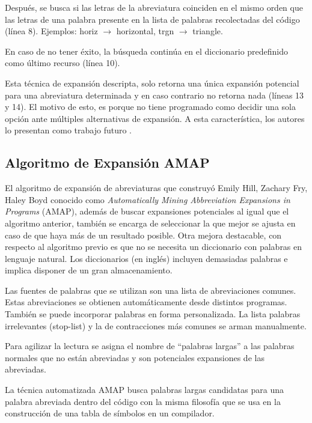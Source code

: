\documentclass[a4paper,12pt]{report}
\begin{document}
Después, se busca si las letras de la abreviatura coinciden en el mismo orden que las letras de una palabra presente en la lista de palabras recolectadas del código (línea 8). Ejemplos: \textsf{horiz} $\rightarrow$ \textsf{horizontal}, \textsf{trgn} $\rightarrow$ \textsf{triangle}.

En caso de no tener éxito, la búsqueda continúa en el diccionario predefinido como último recurso (línea 10).


Esta técnica de expansión descripta, solo retorna una única expansión potencial para una abreviatura determinada y en caso contrario no retorna nada (líneas 13 y 14). El motivo de esto, es porque no tiene programado como decidir una sola opción ante múltiples alternativas de expansión. A esta característica, los autores lo presentan como trabajo futuro \cite{LFBEX07,EZH08}.

\subsection{Algoritmo de Expansión AMAP}

El algoritmo de expansión de abreviaturas que construyó Emily Hill, Zachary Fry, Haley Boyd \cite{EZH08} conocido como \textit{Automatically Mining Abbreviation Expansions in Programs} (AMAP), además de buscar expansiones potenciales al igual que el algoritmo anterior, también se encarga de seleccionar la que mejor se ajusta en caso de que haya más de un resultado posible. Otra mejora destacable, con respecto al algoritmo previo es que no se necesita un diccionario con palabras en lenguaje natural. Los diccionarios (en inglés) incluyen demasiadas palabras e implica disponer de un gran almacenamiento. 

Las fuentes de palabras que se utilizan son una lista de abreviaciones comunes. Estas abreviaciones se obtienen automáticamente desde distintos programas. También se puede incorporar palabras en forma personalizada. La lista palabras irrelevantes (stop-list) y la de contracciones más comunes se arman manualmente.

Para agilizar la lectura se asigna el nombre de “palabras largas” a las palabras normales que no están abreviadas y son potenciales expansiones de las abreviadas.

La técnica automatizada AMAP busca palabras largas candidatas para una palabra abreviada dentro del código con la misma filosofía que se usa en la construcción de una tabla de símbolos en un compilador.
\end{document}
